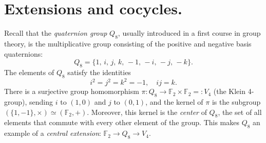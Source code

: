 \documentclass{article}
\theoremstyle{plain}
\theoremstyle{definition}
\def \cC {\mathcal{C}}
\def \FF {\mathbb{F}}
\begin{document}



\section{Extensions and cocycles.}

Recall that the \emph{quaternion group} $Q_8$, usually introduced in a first course in group theory, is the multiplicative group consisting of the positive and negative basis quaternions:
\[
	Q_8 = \{1,\, i,\, j,\, k,\,-1,\, -i,\, -j,\, -k\}.
\]
The elements of $Q_8$ satisfy the identities
\[
	i^2 = j^2 = k^2 = -1, \quad ij=k.
\]
There is a surjective group homomorphism $\pi\colon Q_8 \to \FF_2 \times \FF_2 =: V_4$ (the Klein 4-group), sending $i$ to $(1,0)$ and $j$ to $(0,1)$, and the kernel of $\pi$ is the subgroup $(\{1,-1\},\times)\simeq (\FF_2,+)$.
Moreover, this kernel is the \emph{center} of $Q_8$, the set of all elements that commute with every other element of the group. This makes $Q_8$ an example of a \emph{central extension}: $\FF_2\to Q_8 \to V_4$.
\end{document}
